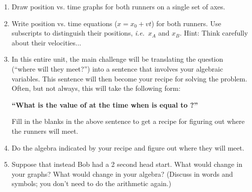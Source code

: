 \documentclass[12pt]{article}
\newcommand{\ie}{{\em i.e.\ }}
\begin{document}
\begin{enumerate}

\item Draw position vs. time graphs for both runners on a single set of axes.






\item Write position vs. time equations ($x=x_0 + vt$) for both runners. Use subscripts to distinguish their positions, \ie $x_A$ and $x_B$. Hint: Think carefully about their velocities...

\vspace{1.5in}

\item In this entire unit, the main challenge will be translating the question (``where will they meet?'') into a sentence that involves your algebraic variables. This sentence will then become your recipe for solving the problem.
Often, but not always, this will take the following form: 

\begin{center}
{\bf ``What is the value of \underline{\hspace{0.7in}} at the time when \underline{\hspace{0.7in}} is equal to \underline{\hspace{0.7in}}?''} 
\end{center}

Fill in the blanks in the above sentence to get a recipe for figuring out where the runners will meet.

\item Do the algebra indicated by your recipe and figure out where they will meet.

\vspace{3in}

\item Suppose that instead Bob had a 2 second head start. What would change in your graphs? What would change in your algebra? (Discuss in words and symbols; you don't need to do the arithmetic again.)
\end{enumerate}
\end{document}
